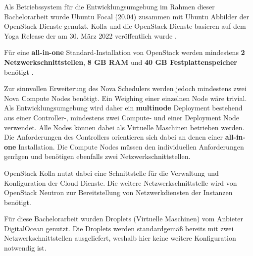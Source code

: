 \documentclass[../Main.tex]{subfiles}
\begin{document}
Als Betriebssystem für die Entwicklungsumgebung im Rahmen dieser Bachelorarbeit wurde Ubuntu Focal (20.04) zusammen mit Ubuntu Abbilder
der OpenStack Dienste genutzt. Kolla und die OpenStack Dienste basieren auf dem Yoga Release der am 30. März 2022 veröffentlich wurde \citep{OpenstackYogaRelease}.

Für eine \textbf{all-in-one} Standard-Installation von OpenStack werden mindestens \textbf{2 Netzwerkschnittstellen},
\textbf{8 GB RAM} und \textbf{40 GB Festplattenspeicher} benötigt \citep{KollaQuickStart}.

Zur sinnvollen Erweiterung des Nova Schedulers werden jedoch mindestens zwei Nova Compute Nodes benötigt.
Ein Weighing einer einzelnen Node wäre trivial. Als Entwicklungsumgebung wird daher ein \textbf{multinode}
Deployment bestehend aus einer Controller-, mindestens zwei Compute- und einer Deployment Node verwendet.
Alle Nodes können dabei als Virtuelle Maschinen betrieben werden. Die Anforderungen des Controllers orientieren
sich dabei an denen einer \textbf{all-in-one} Installation. Die Compute Nodes müssen den individuellen Anforderungen
genügen und benötigen ebenfalls zwei Netzwerkschnittstellen.

OpenStack Kolla nutzt dabei eine Schnittstelle für die Verwaltung und Konfiguration der Cloud Dienste.
Die weitere Netzwerkschnittstelle wird von OpenStack Neutron zur Bereitstellung von Netzwerkdiensten der Instanzen benötigt.

Für diese Bachelorarbeit wurden Droplets (Virtuelle Maschinen) vom Anbieter DigitalOcean genutzt. Die Droplets
werden standardgemä{\ss} bereits mit zwei Netzwerkschnittstellen ausgeliefert, weshalb hier keine weitere
Konfiguration notwendig ist.

\biblio %
\end{document}

